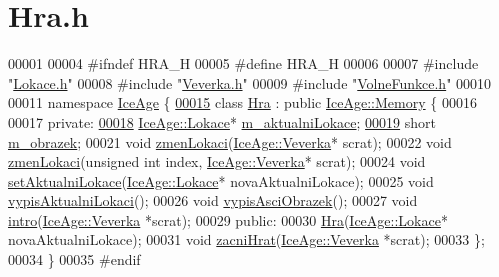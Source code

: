 \hypertarget{Hra_8h_source}{}\section{Hra.\+h}
\label{Hra_8h_source}

\begin{DoxyCode}
00001 
00004 \textcolor{preprocessor}{#ifndef HRA\_H}
00005 \textcolor{preprocessor}{#define HRA\_H}
00006 
00007 \textcolor{preprocessor}{#include "\hyperlink{Lokace_8h}{Lokace.h}"}
00008 \textcolor{preprocessor}{#include "\hyperlink{Veverka_8h}{Veverka.h}"}
00009 \textcolor{preprocessor}{#include "\hyperlink{VolneFunkce_8h}{VolneFunkce.h}"}
00010 
00011 \textcolor{keyword}{namespace }\hyperlink{namespaceIceAge}{IceAge} \{
\hypertarget{Hra_8h_source.tex_l00015}{}\hyperlink{classIceAge_1_1Hra}{00015}     \textcolor{keyword}{class }\hyperlink{classIceAge_1_1Hra}{Hra} : \textcolor{keyword}{public} \hyperlink{classIceAge_1_1Memory}{IceAge::Memory} \{
00016 
00017     \textcolor{keyword}{private}:
\hypertarget{Hra_8h_source.tex_l00018}{}\hyperlink{classIceAge_1_1Hra_a2d006812c29f093c47054be30c8b7591}{00018}         \hyperlink{classIceAge_1_1Lokace}{IceAge::Lokace}* \hyperlink{classIceAge_1_1Hra_a2d006812c29f093c47054be30c8b7591}{m\_aktualniLokace}; 
\hypertarget{Hra_8h_source.tex_l00019}{}\hyperlink{classIceAge_1_1Hra_aca22307d63587a6fc2f835fdf8b28a21}{00019}         \textcolor{keywordtype}{short} \hyperlink{classIceAge_1_1Hra_aca22307d63587a6fc2f835fdf8b28a21}{m\_obrazek}; 
00021         \textcolor{keywordtype}{void} \hyperlink{classIceAge_1_1Hra_a9429d4476f187d8a80dde5944704fab7}{zmenLokaci}(\hyperlink{classIceAge_1_1Veverka}{IceAge::Veverka}* scrat); 
00022         \textcolor{keywordtype}{void} \hyperlink{classIceAge_1_1Hra_a9429d4476f187d8a80dde5944704fab7}{zmenLokaci}(\textcolor{keywordtype}{unsigned} \textcolor{keywordtype}{int} index, \hyperlink{classIceAge_1_1Veverka}{IceAge::Veverka}* scrat);
00024         \textcolor{keywordtype}{void} \hyperlink{classIceAge_1_1Hra_a1fad6152ce71d1e2912e538f3c330d29}{setAktualniLokace}(\hyperlink{classIceAge_1_1Lokace}{IceAge::Lokace}* novaAktualniLokace);
00025         \textcolor{keywordtype}{void} \hyperlink{classIceAge_1_1Hra_af0fafa4884c5107939edc907cc7de1a9}{vypisAktualniLokaci}();
00026         \textcolor{keywordtype}{void} \hyperlink{classIceAge_1_1Hra_a28f302456724c7a0901e16a940ea6c67}{vypisAsciObrazek}(); 
00027         \textcolor{keywordtype}{void} \hyperlink{classIceAge_1_1Hra_acca9aa3823d78712b66e371fabbaf351}{intro}(\hyperlink{classIceAge_1_1Veverka}{IceAge::Veverka} *scrat);
00029     \textcolor{keyword}{public}:
00030         \hyperlink{classIceAge_1_1Hra_ae4538962681c44e099fac261639e4063}{Hra}(\hyperlink{classIceAge_1_1Lokace}{IceAge::Lokace}* novaAktualniLokace); 
00031         \textcolor{keywordtype}{void} \hyperlink{classIceAge_1_1Hra_a60ee65556b0198201f3e5fd8d2cd97e0}{zacniHrat}(\hyperlink{classIceAge_1_1Veverka}{IceAge::Veverka} *scrat); 
00033     \};
00034 \}
00035 \textcolor{preprocessor}{#endif}
\end{DoxyCode}
